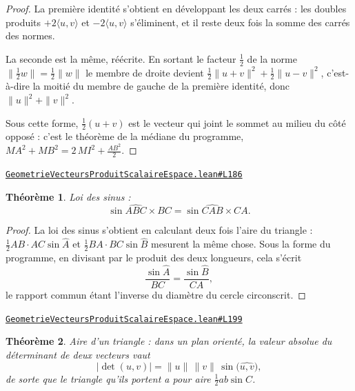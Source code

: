\documentclass[11pt,a4paper]{article}
\theoremstyle{definition}
\theoremstyle{plain}
\newtheorem{theoreme}{Théorème}
\newcommand{\source}[2]{\par\smallskip\noindent\hfill{\footnotesize\href{#1}{\texttt{#2}}}\par\smallskip}
\begin{document}
\begin{proof}
La première identité s'obtient en développant les deux carrés : les doubles produits
$+2\langle u, v\rangle$ et $-2\langle u, v\rangle$ s'éliminent, et il reste deux fois la
somme des carrés des normes.

La seconde est la même, réécrite. En sortant le facteur $\frac{1}{2}$ de la norme
\textemdash{} $\|\frac{1}{2}w\| = \frac{1}{2}\|w\|$ \textemdash{} le membre de droite
devient $\frac{1}{2}\|u+v\|^{2} + \frac{1}{2}\|u-v\|^{2}$, c'est-à-dire la moitié du membre
de gauche de la première identité, donc $\|u\|^{2} + \|v\|^{2}$.

\medskip\noindent
Sous cette forme, $\frac{1}{2}(u+v)$ est le vecteur qui joint le sommet au milieu du côté
opposé : c'est le théorème de la médiane du programme,
$MA^{2} + MB^{2} = 2\,MI^{2} + \frac{AB^{2}}{2}$.
\end{proof}
\source{https://github.com/Commutator-IO/learn-lean/blob/main/courses/02-lycee/08-geometrie-vecteurs-produit-scalaire-espace/GeometrieVecteursProduitScalaireEspace.lean\#L186}{GeometrieVecteursProduitScalaireEspace.lean\#L186}

\begin{theoreme}
Loi des sinus :
\[ \sin\widehat{ABC} \times BC = \sin\widehat{CAB} \times CA . \]
\end{theoreme}

\begin{proof}
La loi des sinus s'obtient en calculant deux fois l'aire du triangle : $\tfrac12 AB \cdot AC
\sin \widehat{A}$ et $\tfrac12 BA \cdot BC \sin \widehat{B}$ mesurent la même chose. Sous la
forme du programme, en divisant par le produit des deux longueurs, cela s'écrit
\[ \frac{\sin \widehat{A}}{BC} = \frac{\sin \widehat{B}}{CA} , \]
le rapport commun étant l'inverse du diamètre du cercle circonscrit.
\end{proof}
\source{https://github.com/Commutator-IO/learn-lean/blob/main/courses/02-lycee/08-geometrie-vecteurs-produit-scalaire-espace/GeometrieVecteursProduitScalaireEspace.lean\#L199}{GeometrieVecteursProduitScalaireEspace.lean\#L199}

\begin{theoreme}
Aire d'un triangle : dans un plan orienté, la valeur absolue du déterminant de deux
vecteurs vaut
\[ |\det(u, v)| = \|u\|\,\|v\|\,\sin\bigl(\widehat{u, v}\bigr) , \]
de sorte que le triangle qu'ils portent a pour aire $\frac{1}{2}ab\sin C$.
\end{theoreme}
\end{document}
